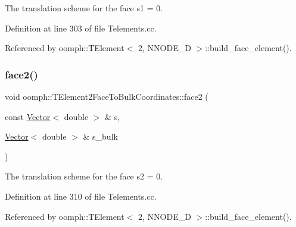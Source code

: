The translation scheme for the face s1 = 0. 



Definition at line 303 of file Telements.\+cc.



Referenced by oomph\+::\+T\+Element$<$ 2, N\+N\+O\+D\+E\+\_\+D $>$\+::build\+\_\+face\+\_\+element().

\mbox{\label{namespaceoomph_1_1TElement2FaceToBulkCoordinates_ab06fc24227192debadc7104abd85cb5b}} 
\subsubsection{\texorpdfstring{face2()}{face2()}}
{\footnotesize\ttfamily void oomph\+::\+T\+Element2\+Face\+To\+Bulk\+Coordinates\+::face2 (\begin{DoxyParamCaption}\item[{const \hyperlink{classoomph_1_1Vector}{Vector}$<$ double $>$ \&}]{s,  }\item[{\hyperlink{classoomph_1_1Vector}{Vector}$<$ double $>$ \&}]{s\+\_\+bulk }\end{DoxyParamCaption})}



The translation scheme for the face s2 = 0. 



Definition at line 310 of file Telements.\+cc.



Referenced by oomph\+::\+T\+Element$<$ 2, N\+N\+O\+D\+E\+\_\+D $>$\+::build\+\_\+face\+\_\+element().

